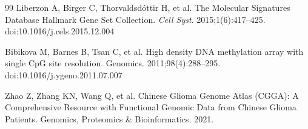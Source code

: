 \documentclass[11pt, letterpaper]{article}
\begin{document}
\begin{thebibliography}{99}
Liberzon A, Birger C, Thorvaldsdóttir H, et al.
The Molecular Signatures Database Hallmark Gene Set Collection.
\textit{Cell Syst}. 2015;1(6):417--425. doi:10.1016/j.cels.2015.12.004

Bibikova M, Barnes B, Tsan C, et al.
High density DNA methylation array with single CpG site resolution.
Genomics. 2011;98(4):288--295. doi:10.1016/j.ygeno.2011.07.007

Zhao Z, Zhang KN, Wang Q, et al.
Chinese Glioma Genome Atlas (CGGA): A Comprehensive Resource with Functional Genomic Data from Chinese Glioma Patients. Genomics, Proteomics & Bioinformatics. 2021.

\end{thebibliography}
\end{document}

